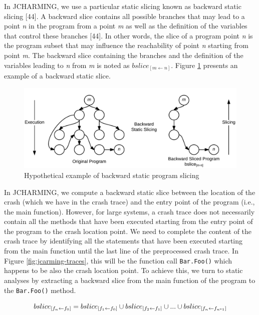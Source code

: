 \documentclass[12pt]{report}
\def\mymathhyphen{{\hbox{-}}}
\begin{document}
In JCHARMING, we use a particular static slicing known as backward
static slicing {[}44{]}. A backward slice contains all possible branches
that may lead to a point \emph{n} in the program from a point \emph{m}
as well as the definition of the variables that control these branches
{[}44{]}. In other words, the slice of a program point \emph{n} is the
program subset that may influence the reachability of point \emph{n}
starting from point \emph{m}. The backward slice containing the branches
and the definition of the variables leading to \emph{n} from \emph{m} is
noted as \(bslice_{[m \leftarrow n]}\). Figure
\ref{fig:backward-slicing} presents an example of a backward static
slice.

\begin{figure}
  \centering
    \includegraphics[scale=.2]{media/chap8/backward-slicing.png}
    \caption{Hypothetical example of backward static program slicing\label{fig:backward-slicing}}
\end{figure}

In JCHARMING, we compute a backward static slice between the location of
the crash (which we have in the crash trace) and the entry point of the
program (i.e., the main function). However, for large systems, a crash
trace does not necessarily contain all the methods that have been
executed starting from the entry point of the program to the crash
location point. We need to complete the content of the crash trace by
identifying all the statements that have been executed starting from the
main function until the last line of the preprocessed crash trace. In
Figure \ref{fig:jcarming-traces}, this will be the function call
\lstinline!Bar.Foo()! which happens to be also the crash location point.
To achieve this, we turn to static analyses by extracting a backward
slice from the main function of the program to the \lstinline!Bar.Foo()!
method.

\begin{equation}
bslice_{[f_n \leftarrow f_0]} = bslice_{[f_1 \leftarrow f_0]} \cup bslice_{[f_2 \leftarrow f_1]} \cup ... \cup bslice_{[f_n \leftarrow f_{n\mymathhyphen1}]}
\end{equation}
\end{document}
